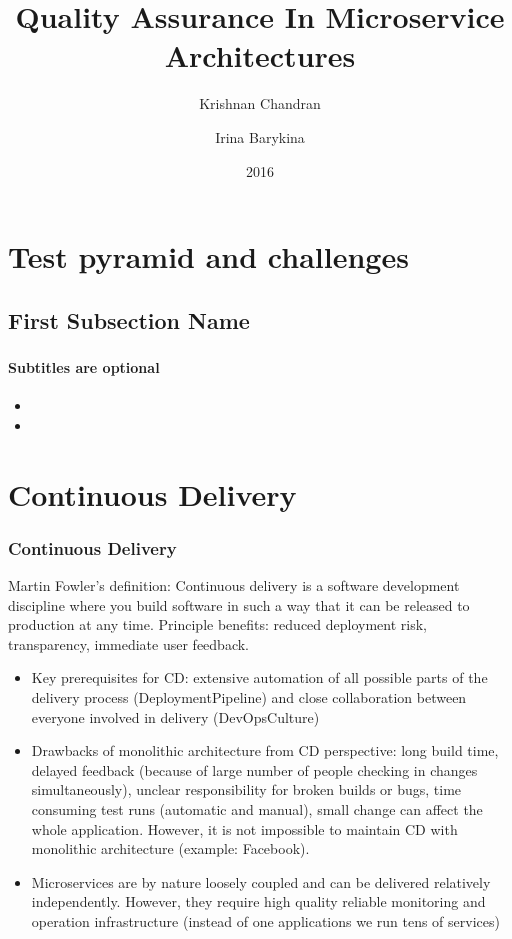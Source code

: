 \documentclass{beamer}
\title{Quality Assurance In Microservice Architectures}
\author{Krishnan Chandran \and Irina Barykina}
\institute[NYU]
{
Department of Informatics,\\
Intelligent Adaptive Systems, UHH\\
}
\date{2016}
\begin{document}
\begin{frame}
\titlepage
\end{frame}


\section{Test pyramid and challenges}
\subsection[Short First Subsection Name]{First Subsection Name}

\begin{frame}
	\frametitle{}	
	\framesubtitle{Subtitles are optional}

	\begin{itemize}
 		 \item
		 \item
	\end{itemize}
\end{frame}


\section{Continuous Delivery}
\begin{frame}
	\frametitle{Continuous Delivery} 
	\begin{block}{Martin Fowler's definition:}
		 Continuous delivery is a software development discipline where you build software in such a way that it can be released to production at any time. Principle benefits: reduced deployment risk, transparency, immediate user feedback.	
	\end{block}
	\begin{itemize}
		 \item Key prerequisites for CD: extensive automation of all possible parts of the delivery process (DeploymentPipeline) and close collaboration between everyone involved in delivery (DevOpsCulture) 
  		 \item Drawbacks of monolithic architecture from CD perspective: long build time, delayed feedback (because of large number of people checking in changes simultaneously), unclear responsibility for broken builds or bugs, time consuming test runs (automatic and manual), small change can affect the whole application. However, it is not impossible to maintain CD with monolithic architecture (example: Facebook).
                 \item Microservices are by nature loosely coupled and can be delivered relatively independently. However, they require high quality reliable monitoring and operation infrastructure (instead of one applications we run tens of services)
	\end{itemize}
\end{frame}
\end{document}
